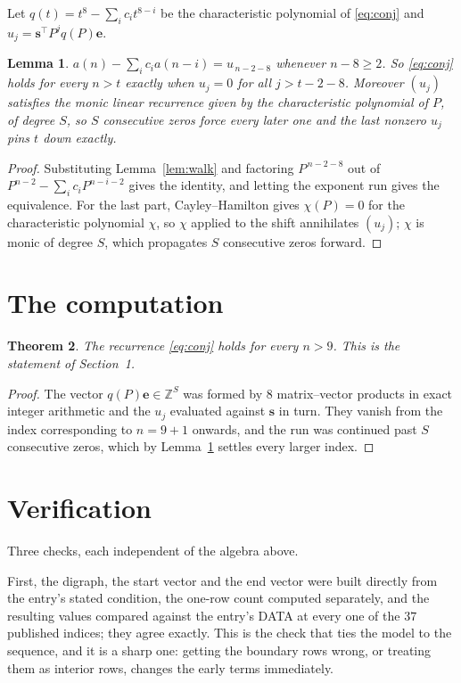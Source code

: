 \documentclass[11pt,a4paper]{article}
\theoremstyle{plain}
\newtheorem{theorem}{Theorem}
\newtheorem{lemma}[theorem]{Lemma}
\theoremstyle{definition}
\begin{document}
Let $q(t)=t^{8}-\sum_i c_i t^{8-i}$ be the characteristic polynomial of
\eqref{eq:conj} and $u_j=\mathbf{s}^{\!\top}P^{j}q(P)\mathbf{e}$.

\begin{lemma}\label{lem:crit}
$a(n)-\sum_i c_i a(n-i)=u_{\,n-2-8}$ whenever $n-8\ge2$. So \eqref{eq:conj}
holds for every $n>t$ exactly when $u_j=0$ for all $j>t-2-8$. Moreover $(u_j)$
satisfies the monic linear recurrence given by the characteristic polynomial of $P$, of
degree $S$, so $S$ consecutive zeros force every later one and the last nonzero $u_j$ pins
$t$ down exactly.
\end{lemma}

\begin{proof}
Substituting Lemma~\ref{lem:walk} and factoring $P^{\,n-2-8}$ out of
$P^{n-2}-\sum_i c_i P^{n-i-2}$ gives the identity, and letting the exponent run gives the
equivalence. For the last part, Cayley--Hamilton gives $\chi(P)=0$ for the characteristic
polynomial $\chi$, so $\chi$ applied to the shift annihilates $(u_j)$; $\chi$ is monic of
degree $S$, which propagates $S$ consecutive zeros forward.
\end{proof}

\section{The computation}

\begin{theorem}
The recurrence \eqref{eq:conj} holds for every $n>9$. This is the statement of
Section~1.
\end{theorem}

\begin{proof}
The vector $q(P)\mathbf{e}\in\mathbb{Z}^{S}$ was formed by $8$ matrix--vector
products in exact integer arithmetic and the $u_j$ evaluated against $\mathbf{s}$ in turn.
They vanish from the index corresponding to $n=9+1$ onwards, and the run was continued
past $S$ consecutive zeros, which by Lemma~\ref{lem:crit} settles every larger index.
\end{proof}

\section{Verification}

Three checks, each independent of the algebra above.

First, the digraph, the start vector and the end vector were built directly from the
entry's stated condition, the one-row count computed separately, and the resulting values
compared against the entry's DATA at every one of the $37$ published indices; they
agree exactly. This is the check that ties the model to the sequence, and it is a sharp one:
getting the boundary rows wrong, or treating them as interior rows, changes the early terms
immediately.
\end{document}
